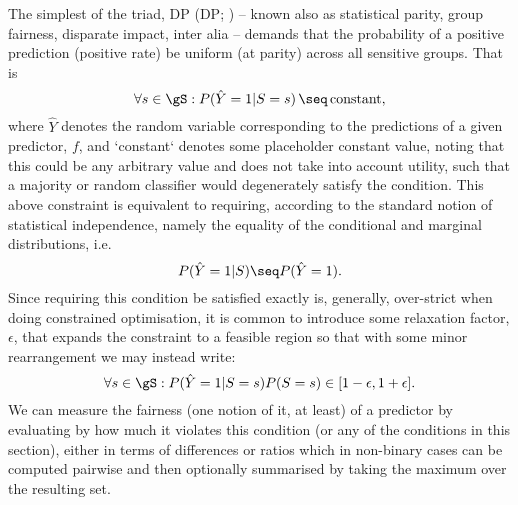 %
The simplest of the triad, \acl{DP} (\acs{DP}; \citealp{zemel2013learning,
feldman2015certifying}) -- known also as statistical parity, group fairness, disparate impact,
inter alia -- demands that the probability of a positive prediction (positive rate) be uniform
(at parity) across all sensitive groups. 
%
That is
%
\begin{equation}
    \forall s \in \gS: P( \hat{Y} = 1 | S = s ) \,\seq\, \text{constant},
\end{equation}
%
where \(\hat{Y}\) denotes the random variable corresponding to the predictions of a given
predictor, \(f\), and `constant` denotes some placeholder constant value, noting that this could be
any arbitrary value and does not take into account utility, such that a majority or random
classifier would degenerately satisfy the condition. 
%
This above constraint is equivalent to requiring, according to the standard notion of statistical
independence, namely the equality of the conditional and marginal distributions, i.e.\
%
\begin{equation}
    P( \hat{Y} = 1 | S) \seq P( \hat{Y} = 1 ).
\end{equation}
%
%
Since requiring this condition be satisfied exactly is, generally, over-strict when doing
constrained optimisation, it is common to introduce some relaxation factor, \(\epsilon\), that
expands the constraint to a feasible region so that with some minor rearrangement we may instead
write:
%
\begin{equation}
    \forall s \in \gS: P(\hat{Y}=1|S=s) P(S=s) \in [ 1 - \epsilon, 1 + \epsilon ]. 
%
\end{equation}
%
We can measure the fairness (one notion of it, at least) of a predictor by evaluating by how much
it violates this condition (or any of the conditions in this section), either in terms of
differences or ratios  which in non-binary cases can be computed pairwise and then optionally
summarised by taking the maximum over the resulting set.

